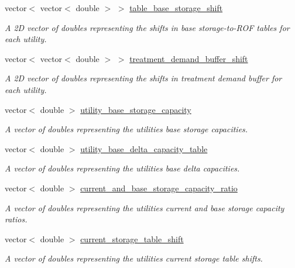 \begin{DoxyCompactItemize}
vector$<$ vector$<$ double $>$ $>$ \mbox{\hyperlink{classContinuityModelROF_a2bc5728653819a0d54a36ffbb1df44a3}{table\+\_\+base\+\_\+storage\+\_\+shift}}
\begin{DoxyCompactList}\small\item\em A 2D vector of doubles representing the shifts in base storage-\/to-\/\+R\+OF tables for each utility. \end{DoxyCompactList}\item 
vector$<$ vector$<$ double $>$ $>$ \mbox{\hyperlink{classContinuityModelROF_aedb1313e889617d718d2a93d719cb3f1}{treatment\+\_\+demand\+\_\+buffer\+\_\+shift}}
\begin{DoxyCompactList}\small\item\em A 2D vector of doubles representing the shifts in treatment demand buffer for each utility. \end{DoxyCompactList}\item 
vector$<$ double $>$ \mbox{\hyperlink{classContinuityModelROF_a6a429c37f019777325ea4e5b9ad26cae}{utility\+\_\+base\+\_\+storage\+\_\+capacity}}
\begin{DoxyCompactList}\small\item\em A vector of doubles representing the utilities\textquotesingle{} base storage capacities. \end{DoxyCompactList}\item 
vector$<$ double $>$ \mbox{\hyperlink{classContinuityModelROF_a017041335a639ba56cc3e26dea07b514}{utility\+\_\+base\+\_\+delta\+\_\+capacity\+\_\+table}}
\begin{DoxyCompactList}\small\item\em A vector of doubles representing the utilities\textquotesingle{} base delta capacities. \end{DoxyCompactList}\item 
vector$<$ double $>$ \mbox{\hyperlink{classContinuityModelROF_adcaf978b52ba016474952a42856ba373}{current\+\_\+and\+\_\+base\+\_\+storage\+\_\+capacity\+\_\+ratio}}
\begin{DoxyCompactList}\small\item\em A vector of doubles representing the utilities\textquotesingle{} current and base storage capacity ratios. \end{DoxyCompactList}\item 
vector$<$ double $>$ \mbox{\hyperlink{classContinuityModelROF_a443efa8d5a8bcbb1fea1a0bc929c77cd}{current\+\_\+storage\+\_\+table\+\_\+shift}}
\begin{DoxyCompactList}\small\item\em A vector of doubles representing the utilities\textquotesingle{} current storage table shifts. \end{DoxyCompactList}\item 

\end{DoxyCompactItemize}

